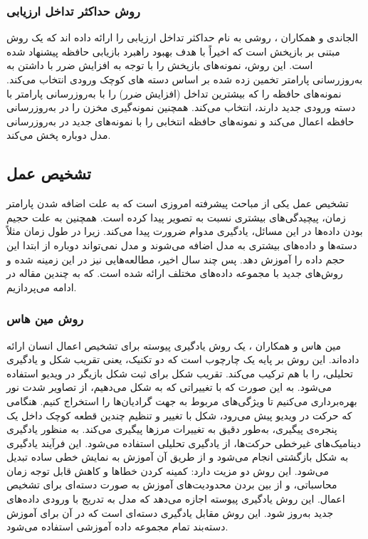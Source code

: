 \subsubsection{روش حداکثر تداخل ارزیابی}
الجاندی و همکاران 
\cite{12}
، روشی به نام حداکثر تداخل ارزیابی
را ارائه داده اند که یک روش مبتنی بر بازپخش است که اخیراً با هدف بهبود راهبرد بازیابی حافظه پیشنهاد شده است. این روش، نمونه‌های بازپخش را با توجه به افزایش ضرر با داشتن به به‌روزرسانی پارامتر تخمین زده شده بر اساس دسته های کوچک ورودی انتخاب می‌کند. نمونه‌های حافظه را که بیشترین تداخل (افزایش ضرر) را با به‌روزرسانی پارامتر با دسته ورودی جدید دارند، انتخاب می‌کند. همچنین نمونه‌گیری مخزن را در به‌روزرسانی حافظه اعمال می‌کند و نمونه‌های حافظه انتخابی را با نمونه‌های جدید در به‌روزرسانی مدل دوباره پخش می‌کند.

\subsection{تشخیص عمل}
تشخیص عمل یکی از مباحث پیشرفته امروزی است که به علت اضافه شدن پارامتر زمان، پیچیدگی‌های بیشتری نسبت به تصویر پیدا کرده است. همچنین به علت حجیم بودن داده‌ها در این مسائل، یادگیری مدوام ضرورت پیدا می‌کند. زیرا در طول زمان مثلاً دسته‌ها و داده‌های بیشتری به مدل اضافه می‌شوند و مدل نمی‌تواند دوباره از ابتدا این حجم داده را آموزش دهد. پس چند سال اخیر، مطالعه‌هایی نیز در این زمینه شده و روش‌های جدید با مجموعه داده‌های مختلف ارائه شده است. که به چندین مقاله در ادامه می‌پردازیم.

\subsubsection{روش مین هاس}
مین هاس و همکاران 
\cite{13}
، یک روش یادگیری پیوسته برای تشخیص اعمال انسان ارائه داده‌اند. این روش بر پایه یک چارچوب است که دو تکنیک، یعنی تقریب شکل و یادگیری تحلیلی، را با هم ترکیب می‌کند. تقریب شکل برای ثبت شکل بازیگر در ویدیو استفاده می‌شود. به این صورت که با تغییراتی که به شکل می‌دهیم، از تصاویر شدت نور بهره‌برداری می‌کنیم تا ویژگی‌های مربوط به جهت گرادیان‌ها را استخراج کنیم. هنگامی که حرکت در ویدیو پیش می‌رود، شکل با تغییر و تنظیم چندین قطعه کوچک داخل یک پنجره‌ی پیگیری، به‌طور دقیق به تغییرات مرزها پیگیری می‌کند. به منظور یادگیری دینامیک‌های غیرخطی حرکت‌ها، از یادگیری تحلیلی استفاده می‌شود. این فرآیند یادگیری به شکل بازگشتی انجام می‌شود و از طریق آن آموزش به نمایش خطی ساده تبدیل می‌شود. این روش دو مزیت دارد: کمینه کردن خطاها و کاهش قابل توجه زمان محاسباتی، و از بین بردن محدودیت‌های آموزش به صورت دسته‌ای برای تشخیص اعمال. این روش یادگیری پیوسته اجازه می‌دهد که مدل به تدریج با ورودی داده‌های جدید به‌روز شود. این روش مقابل یادگیری دسته‌ای است که در آن برای آموزش دسته‌بند تمام مجموعه داده آموزشی استفاده می‌شود.

